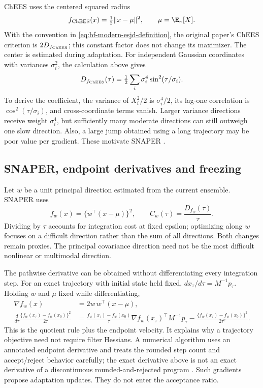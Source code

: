 ChEES uses the centered squared radius
\begin{equation}
 f_{\rm ChEES}(x)=\tfrac12\|x-\mu\|^2,\qquad
 \mu=\E_\pi[X].
 \label{eq:bf-modern-chees}
\end{equation}
With the convention in \eqref{eq:bf-modern-esjd-definition}, the original
paper's ChEES criterion is $2D_{f_{\rm ChEES}}$; this constant factor does
not change its maximizer. The center is estimated during adaptation.
For independent Gaussian
coordinates with variances $\sigma_i^2$, the calculation above gives
\begin{equation}
 D_{f_{\rm ChEES}}(\tau)
       =\tfrac12\sum_i\sigma_i^4\sin^2(\tau/\sigma_i).
 \label{eq:bf-modern-chees-gaussian}
\end{equation}
To derive the coefficient, the variance of $X_i^2/2$ is
$\sigma_i^4/2$, its lag-one correlation is
$\cos^2(\tau/\sigma_i)$, and cross-coordinate terms vanish. Larger
variance directions receive weight $\sigma_i^4$, but sufficiently many
moderate directions can still outweigh one slow direction. Also, a large
jump obtained using a long trajectory may be poor value per gradient. These
motivate SNAPER \citep{hoffman2021chees,sountsov2022snaper}.

\subsection{SNAPER, endpoint derivatives and freezing}

Let $w$ be a unit principal direction estimated from the current ensemble.
SNAPER uses
\begin{equation}
 f_w(x)=\{w^\top(x-\mu)\}^2,\qquad
 C_w(\tau)=\frac{D_{f_w}(\tau)}{\tau}.
 \label{eq:bf-modern-snaper}
\end{equation}
Dividing by $\tau$ accounts for integration cost at fixed epsilon; optimizing
along $w$ focuses on a difficult direction rather than the sum of all
directions. Both changes remain proxies. The principal covariance direction
need not be the most difficult nonlinear or multimodal direction.

The pathwise derivative can be obtained without differentiating every
integration step. For an exact trajectory with initial state held fixed,
$d x_\tau/d\tau=M^{-1}p_\tau$. Holding $w$ and $\mu$ fixed while
differentiating,
\begin{align}
 \nabla f_w(x)&=2w\,w^\top(x-\mu),\\
 \frac{d}{d\tau}\frac{\{f_w(x_\tau)-f_w(x_0)\}^2}{2\tau}
 &=\frac{f_w(x_\tau)-f_w(x_0)}{\tau}
       \nabla f_w(x_\tau)^\top M^{-1}p_\tau
   -\frac{\{f_w(x_\tau)-f_w(x_0)\}^2}{2\tau^2}.
 \label{eq:bf-modern-snaper-derivative}
\end{align}
This is the quotient rule plus the endpoint velocity. It explains why a
trajectory objective need not require filter Hessians. A numerical algorithm
uses an annotated endpoint derivative and treats the rounded step count and
accept/reject behavior carefully; the exact derivative above is not an exact
derivative of a discontinuous rounded-and-rejected program
\citep[Appendix C]{sountsov2022snaper}. Such gradients propose adaptation
updates. They do not enter the acceptance ratio.

